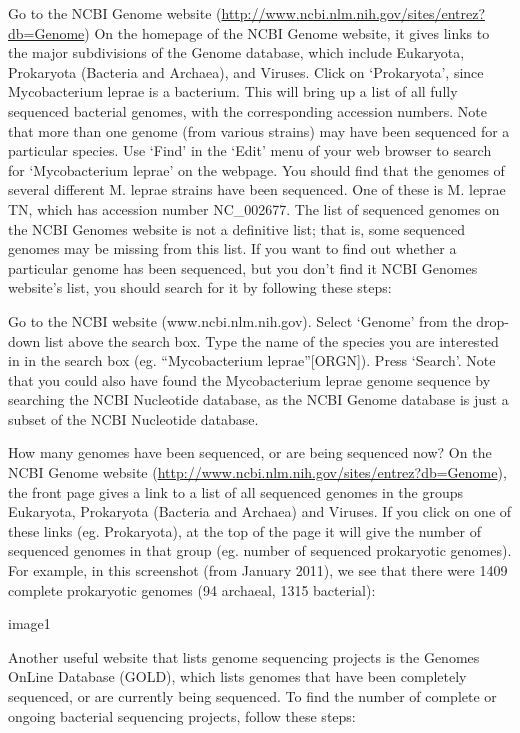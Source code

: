 \documentclass[
]{book}
\begin{document}
Go to the NCBI Genome website (\url{http://www.ncbi.nlm.nih.gov/sites/entrez?db=Genome})
On the homepage of the NCBI Genome website, it gives links to the major subdivisions of the Genome database, which include Eukaryota, Prokaryota (Bacteria and Archaea), and Viruses. Click on `Prokaryota', since Mycobacterium leprae is a bacterium. This will bring up a list of all fully sequenced bacterial genomes, with the corresponding accession numbers. Note that more than one genome (from various strains) may have been sequenced for a particular species.
Use `Find' in the `Edit' menu of your web browser to search for `Mycobacterium leprae' on the webpage. You should find that the genomes of several different M. leprae strains have been sequenced. One of these is M. leprae TN, which has accession number NC\_002677.
The list of sequenced genomes on the NCBI Genomes website is not a definitive list; that is, some sequenced genomes may be missing from this list. If you want to find out whether a particular genome has been sequenced, but you don't find it NCBI Genomes website's list, you should search for it by following these steps:

Go to the NCBI website (www.ncbi.nlm.nih.gov).
Select `Genome' from the drop-down list above the search box.
Type the name of the species you are interested in in the search box (eg. ``Mycobacterium leprae''{[}ORGN{]}). Press `Search'.
Note that you could also have found the Mycobacterium leprae genome sequence by searching the NCBI Nucleotide database, as the NCBI Genome database is just a subset of the NCBI Nucleotide database.

How many genomes have been sequenced, or are being sequenced now?
On the NCBI Genome website (\url{http://www.ncbi.nlm.nih.gov/sites/entrez?db=Genome}), the front page gives a link to a list of all sequenced genomes in the groups Eukaryota, Prokaryota (Bacteria and Archaea) and Viruses. If you click on one of these links (eg. Prokaryota), at the top of the page it will give the number of sequenced genomes in that group (eg. number of sequenced prokaryotic genomes). For example, in this screenshot (from January 2011), we see that there were 1409 complete prokaryotic genomes (94 archaeal, 1315 bacterial):

image1

Another useful website that lists genome sequencing projects is the Genomes OnLine Database (GOLD), which lists genomes that have been completely sequenced, or are currently being sequenced. To find the number of complete or ongoing bacterial sequencing projects, follow these steps:
\end{document}

